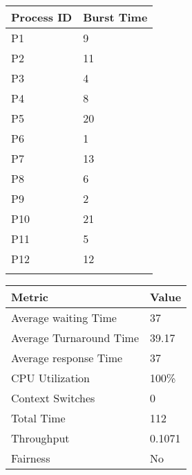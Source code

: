 \documentclass{article}
\begin{document}
\vspace{\baselineskip}
\hspace{1cm}
\begin{minipage}[t]{0.3\textwidth}
    \begin{tabularx}{\textwidth}{|l|X|}
    \hline
    \rowcolor{darkblue}
    \textbf{Process ID} & \textbf{Burst Time}\\
    \hline
    \rowcolor{lightblue}
    P1 & 9 \\
    P2 & 11 \\
    \rowcolor{lightblue}
    P3 & 4 \\
    P4 & 8 \\
    \rowcolor{lightblue}
    P5 & 20 \\
    P6 & 1 \\
    \rowcolor{lightblue}
    P7 & 13 \\
    P8 & 6 \\
    \rowcolor{lightblue}
    P9 & 2 \\
    P10 & 21 \\
    \rowcolor{lightblue}
    P11 & 5 \\
    P12 & 12 \\
    \rowcolor{lightblue}
    \hline
    \end{tabularx}
\end{minipage}
\hspace{2cm}
\begin{minipage}[t!]{0.35\textwidth}
    \begin{tabularx}{\textwidth}{|l|X|}
    \hline
    \rowcolor{darkblue}
    \textbf{Metric} & \textbf{Value} \\
    \hline
    \rowcolor{lightblue}
    Average waiting Time & 37 \\
    Average Turnaround Time & 39.17 \\
    \rowcolor{lightblue}
    Average response Time & 37 \\
    CPU Utilization & 100\% \\
    \rowcolor{lightblue}
    Context Switches & 0 \\
    Total Time & 112 \\
    \rowcolor{lightblue}
    Throughput & 0.1071 \\
    Fairness & No \\
    \hline
    \end{tabularx}
\end{minipage}

\bigskip
\end{document}

